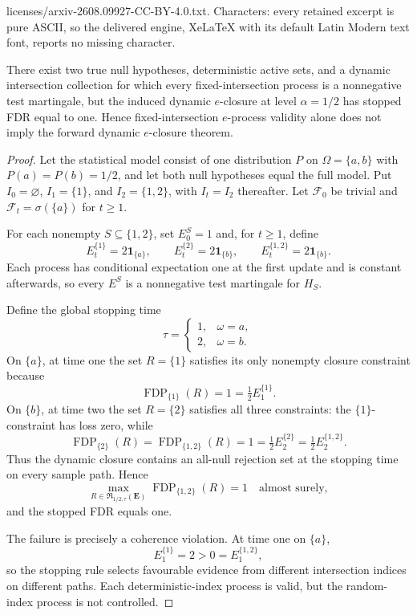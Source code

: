 \documentclass[10pt,a4paper]{amsart}
\newcommand{\FDP}{\operatorname{FDP}}
\newcommand{\F}{\mathcal F}
\newcommand{\Rfam}{\mathfrak R}
\newcommand{\one}{\mathbf 1}
\begin{document}
licenses/arxiv-2608.09927-CC-BY-4.0.txt. Characters: every retained excerpt is pure ASCII, so the delivered engine, XeLaTeX with its default Latin Modern text font, reports no missing character.
\begin{proposition}\label{prop:coherence-necessary}
There exist two true null hypotheses, deterministic active sets, and a dynamic intersection collection for which every fixed-intersection process is a nonnegative test martingale, but the induced dynamic $e$-closure at level $\alpha=1/2$ has stopped FDR equal to one. Hence fixed-intersection $e$-process validity alone does not imply the forward dynamic $e$-closure theorem.
\end{proposition}

\begin{proof}
Let the statistical model consist of one distribution $P$ on $\Omega=\{a,b\}$ with $P(a)=P(b)=1/2$, and let both null hypotheses equal the full model. Put $I_0=\varnothing$, $I_1=\{1\}$, and $I_2=\{1,2\}$, with $I_t=I_2$ thereafter. Let $\F_0$ be trivial and $\F_t=\sigma(\{a\})$ for $t\geq1$.

For each nonempty $S\subseteq\{1,2\}$, set $E_0^S=1$ and, for $t\geq1$, define
\[
 E_t^{\{1\}}=2\one_{\{a\}},\qquad
 E_t^{\{2\}}=2\one_{\{b\}},\qquad
 E_t^{\{1,2\}}=2\one_{\{b\}}.
\]
Each process has conditional expectation one at the first update and is constant afterwards, so every $E^S$ is a nonnegative test martingale for $H_S$.

Define the global stopping time
\[
 \tau=\begin{cases}1,&\omega=a,\\2,&\omega=b.\end{cases}
\]
On $\{a\}$, at time one the set $R=\{1\}$ satisfies its only nonempty closure constraint because
\[
 \FDP_{\{1\}}(R)=1=\tfrac12 E_1^{\{1\}}.
\]
On $\{b\}$, at time two the set $R=\{2\}$ satisfies all three constraints: the $\{1\}$-constraint has loss zero, while
\[
 \FDP_{\{2\}}(R)=\FDP_{\{1,2\}}(R)=1
 =\tfrac12E_2^{\{2\}}=\tfrac12E_2^{\{1,2\}}.
\]
Thus the dynamic closure contains an all-null rejection set at the stopping time on every sample path. Hence
\[
 \max_{R\in\Rfam_{1/2,\tau}(\mathbf E)}\FDP_{\{1,2\}}(R)=1
 \quad\text{almost surely},
\]
and the stopped FDR equals one.

The failure is precisely a coherence violation. At time one on $\{a\}$,
\[
 E_1^{\{1\}}=2>0=E_1^{\{1,2\}},
\]
so the stopping rule selects favourable evidence from different intersection indices on different paths. Each deterministic-index process is valid, but the random-index process is not controlled.
\end{proof}
\end{document}
